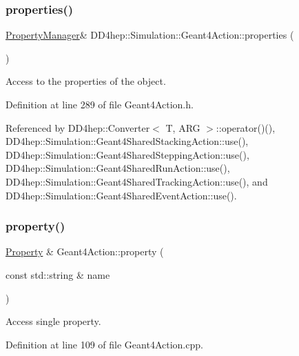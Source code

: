 \subsubsection{\texorpdfstring{properties()}{properties()}}
{\footnotesize\ttfamily \hyperlink{class_d_d4hep_1_1_property_manager}{Property\+Manager}\& D\+D4hep\+::\+Simulation\+::\+Geant4\+Action\+::properties (\begin{DoxyParamCaption}{ }\end{DoxyParamCaption})\hspace{0.3cm}{\ttfamily [inline]}}



Access to the properties of the object. 



Definition at line 289 of file Geant4\+Action.\+h.



Referenced by D\+D4hep\+::\+Converter$<$ T, A\+R\+G $>$\+::operator()(), D\+D4hep\+::\+Simulation\+::\+Geant4\+Shared\+Stacking\+Action\+::use(), D\+D4hep\+::\+Simulation\+::\+Geant4\+Shared\+Stepping\+Action\+::use(), D\+D4hep\+::\+Simulation\+::\+Geant4\+Shared\+Run\+Action\+::use(), D\+D4hep\+::\+Simulation\+::\+Geant4\+Shared\+Tracking\+Action\+::use(), and D\+D4hep\+::\+Simulation\+::\+Geant4\+Shared\+Event\+Action\+::use().

\hypertarget{class_d_d4hep_1_1_simulation_1_1_geant4_action_a7b1a0ac81a980bfa966a972caaaf5bfc}{}\label{class_d_d4hep_1_1_simulation_1_1_geant4_action_a7b1a0ac81a980bfa966a972caaaf5bfc} 
\subsubsection{\texorpdfstring{property()}{property()}}
{\footnotesize\ttfamily \hyperlink{class_d_d4hep_1_1_property}{Property} \& Geant4\+Action\+::property (\begin{DoxyParamCaption}\item[{const std\+::string \&}]{name }\end{DoxyParamCaption})}



Access single property. 



Definition at line 109 of file Geant4\+Action.\+cpp.




